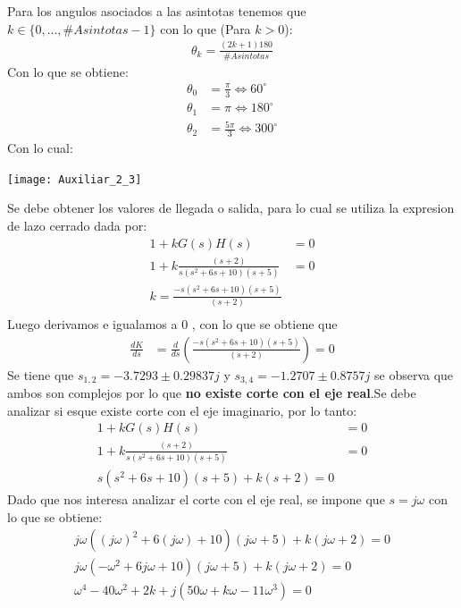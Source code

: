 \documentclass[
  11pt,
  letterpaper,
   addpoints,
   answers
  ]{exam}
\begin{document}
\begin{questions}
\begin{solution}
Para los angulos asociados a las asintotas tenemos que $k \in \{0,\dots, \#Asintotas -1\}$ con lo que (Para $k>0$):
\begin{align}
    \theta_{k} = \frac{(2k+1)180}{\#Asintotas}
\end{align}
Con lo que se obtiene:
\begin{align}
    \theta_{0} &=  \frac{\pi}{3} \Leftrightarrow 60^{\circ} \\
    \theta_{1} &=  \pi \Leftrightarrow 180^{\circ} \\
    \theta_{2} &=  \frac{5\pi}{3} \Leftrightarrow 300^{\circ} 
\end{align}
Con lo cual:
\begin{center}
    \texttt{[image: Auxiliar\_2\_3]}
  \end{center}
Se debe obtener los valores de llegada o salida, para lo cual se utiliza la expresion de lazo cerrado dada por:
\begin{align}
    1+kG(s)H(s) &= 0\\
    1+ k\frac{(s+2)}{s(s^{2}+6s+10)(s+5)} &= 0\\
    k = \frac{-s(s^{2}+6s+10)(s+5)}{(s+2)}\\
\end{align}
Luego derivamos e igualamos a 0 , con lo que se obtiene que 
\begin{align}
    \frac{dK}{ds} &= \frac{d}{ds} \left( \frac{-s(s^{2}+6s+10)(s+5)}{(s+2)} \right) = 0
\end{align}
Se tiene que $s_{1,2}= -3.7293 \pm 0.29837j$ y $s_{3,4}=-1.2707 \pm 0.8757j$ se observa que ambos son complejos por lo que \textbf{no existe corte con el eje real}.Se debe analizar si esque existe corte con el eje imaginario, por lo tanto:
\begin{align}
    1+kG(s)H(s) &= 0\\
    1+k\frac{(s+2)}{s(s^{2}+6s+10)(s+5)} &= 0\\
    s(s^{2}+6s+10)(s+5)+k(s+2)=0
\end{align}
Dado que nos interesa analizar el corte con el eje real, se impone que $s=j\omega$ con lo que se obtiene:
\begin{align}
    j\omega((j\omega)^{2}+6(j\omega)+10)(j\omega+5)+k(j\omega+2)=0\\
    j\omega( -\omega^{2}+6j\omega+10)(j\omega+5)+k(j\omega+2)=0\\
    \omega^{4}-40\omega^{2}+2k + j(50\omega +k\omega-11\omega^{3})=0
\end{align}

\end{solution}
\end{questions}
\end{document}
